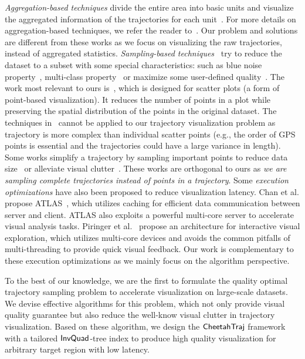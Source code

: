 \textit{Aggregation-based techniques} divide the entire area into basic units and visualize the aggregated information of the trajectories for each unit~\cite{wood2010visualisation,guo2009flow,von2015mobilitygraphs}. For more details on aggregation-based techniques, we refer the reader to~\cite{andrienko2008spatio,adrienko2010spatial}. Our problem and solutions are different from these works as we focus on visualizing the raw trajectories, instead of aggregated statistics. \textit{Sampling-based techniques}~\cite{battle2013dynamic,rapp2019void,chen2014visual,yu2020turbocharging,park2016visualization,qin2020making,DBLP:conf/sigmod/DingHCC016,DBLP:journals/pvldb/KimBPIMR15} try to reduce the dataset to a subset with some special characteristics: such as blue noise property~\cite{rapp2019void}, multi-class property~\cite{chen2014visual} or maximize some user-defined quality~\cite{yu2020turbocharging}. The work most relevant to ours is~\cite{park2016visualization}, which is designed for scatter plots (a form of point-based visualization). It reduces the number of points in a plot while preserving the spatial distribution of the points in the original dataset. The techniques in~\cite{park2016visualization} cannot be applied to our trajectory visualization problem
as trajectory is more complex than individual scatter points (e.g., the order of GPS points is essential and the trajectories could have a large variance in length). Some works simplify a trajectory by sampling important points to reduce data size~\cite{zhang2018trajectory,2018arXiv180303550V} or alleviate visual clutter~\cite{borcan2012improving, 6851202}. These works are orthogonal to ours as \textit{we are sampling complete trajectories instead of points in a trajectory}. Some \textit{execution optimizations} have also been proposed to reduce visualization latency. 
Chan et al. propose ATLAS~\cite{chan2008maintaining}, which utilizes caching for efficient data communication between server and client.
ATLAS also exploits a powerful multi-core server to accelerate visual analysis tasks.
Piringer et al.~\cite{piringer2009multi} propose an architecture for interactive visual exploration,
which utilizes multi-core devices and avoids the common pitfalls of multi-threading to provide quick visual feedback.
Our work is complementary to these execution optimizations as we mainly focus on the algorithm perspective.

 To the best of our knowledge, we are the first to formulate the quality optimal trajectory sampling problem to accelerate visualization on large-scale datasets. We devise effective algorithms for this problem, which not only provide visual quality guarantee but also reduce the well-know visual clutter in trajectory visualization. Based on these algorithm, we design the $\mathsf{CheetahTraj}$ framework with a tailored $\mathsf{InvQuad}$-tree index to produce high quality visualization for arbitrary target region with low latency.

